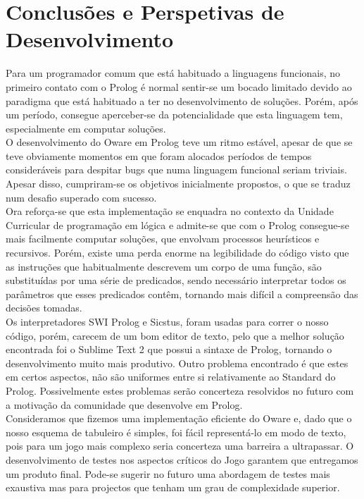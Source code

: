 \documentclass[15pt,a4paper]{article}
\begin{document}
\section{Conclusões e Perspetivas de Desenvolvimento}
Para um programador comum que está habituado a linguagens funcionais, no primeiro contato com o Prolog é normal sentir-se um bocado limitado devido ao paradigma que está habituado a ter no desenvolvimento de soluções. Porém, após um período, consegue aperceber-se da potencialidade que esta linguagem tem, especialmente em computar soluções. \\
\indent O desenvolvimento do Oware em Prolog teve um ritmo estável, apesar de que se teve obviamente momentos em que foram alocados períodos de tempos consideráveis para despitar bugs que numa linguagem funcional seriam triviais. Apesar disso, cumpriram-se os objetivos inicialmente propostos, o que se traduz num desafio superado com sucesso.
\\ \indent Ora reforça-se que esta implementação se enquadra no contexto da Unidade Curricular de programação em lógica e admite-se que com o Prolog consegue-se mais facilmente computar soluções, que envolvam processos heurísticos e recursivos. Porém, existe uma perda enorme na legibilidade do código visto que as instruções que habitualmente descrevem um corpo de uma função, são substituídas por uma série de predicados, sendo necessário interpretar todos os parâmetros que esses predicados contêm, tornando mais difícil a compreensão das decisões tomadas. 
\\ \indent Os interpretadores SWI Prolog e Sicstus, foram usadas para correr o nosso código, porém, carecem de um bom editor de texto, pelo que a melhor solução encontrada foi o Sublime Text 2 que possui a sintaxe de Prolog, tornando o desenvolvimento muito mais produtivo. Outro problema encontrado é que estes em certos aspectos, não são uniformes entre si relativamente ao Standard do Prolog. Possivelmente estes problemas serão concerteza resolvidos no futuro com a motivação da comunidade que desenvolve em Prolog.
\\ 
\indent Consideramos que fizemos uma implementação eficiente do Oware e, dado que o nosso esquema de tabuleiro é simples, foi fácil representá-lo em modo de texto, pois para um jogo mais complexo seria concerteza uma barreira a ultrapassar. O desenvolvimento de testes nos aspectos críticos do Jogo garantem que entregamos um produto final. Pode-se sugerir no futuro uma abordagem de testes mais exaustiva mas para projectos que tenham um grau de complexidade superior. 
\end{document}

